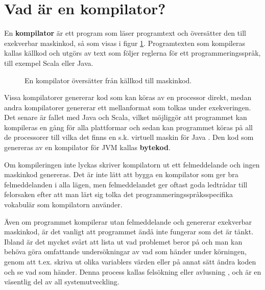 \section{Vad är en kompilator?}

En \textbf{kompilator}  är ett program som läser programtext och översätter den till exekverbar maskinkod, så som visas i figur \ref{fig:appendix:compiler}. Programtexten som kompileras kallas källkod och utgörs av text som följer reglerna för ett programmeringsspråk, till exempel Scala eller Java. 

\begin{figure}[H]
\centering
{}
    \caption{En kompilator översätter från källkod till maskinkod.}
    \label{fig:appendix:compiler}
\end{figure}




Vissa kompilatorer genererar kod som kan köras av en processor direkt, medan andra kompilatorer genererar ett mellanformat som tolkas under exekveringen. Det senare är fallet med Java och Scala, vilket möjliggör att programmet kan kompileras en gång för alla plattformar och sedan kan programmet köras på all de processorer till vilka det finns en s.k. virtuell maskin för Java . Den kod som genereras av en kompilator för JVM kallas \textbf{bytekod}.

Om kompileringen inte lyckas skriver kompilatorn ut ett felmeddelande och ingen maskinkod genereras. Det är inte lätt att bygga en kompilator som ger bra felmeddelanden i alla lägen, men felmeddelandet ger oftast goda ledtrådar till felorsaken efter att man lärt sig tolka det programmeringsspråksspecifika vokabulär som kompilatorn använder.

Även om programmet kompilerar utan felmeddelande och genererar exekverbar maskinkod, är det vanligt att programmet ändå inte fungerar som det är tänkt. Ibland är det mycket svårt att lista ut vad problemet beror på och man kan behöva göra omfattande undersökningar av vad som händer under körningen, genom att t.ex. skriva ut olika variablers värden eller på annat sätt ändra koden och se vad som händer. Denna process kallas felsökning eller avlusning , och är en väsentlig del av all systemutveckling. 


